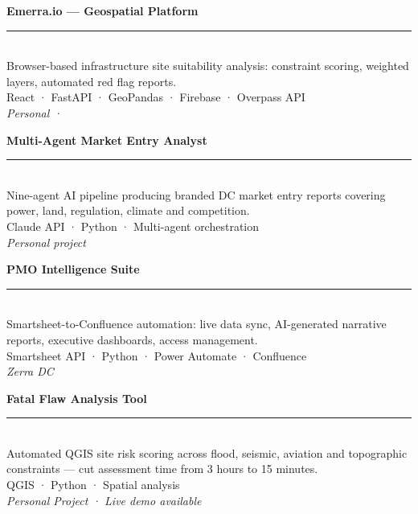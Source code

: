 \newcommand{\shortproject}[4]{%
  \begin{minipage}[t]{0.46\textwidth}
    \vspace{0pt}
    {\small\textcolor{Primary2}{\textbf{#1}}}\\
    {\color{Primary2}\rule{\linewidth}{0.4pt}}\\[1pt]
    {\small\textcolor{Dark}{#2}}\\[2pt]
    {\footnotesize\textcolor{Grey1}{#3}}\\[1pt]
    {\footnotesize\textit{#4}}
  \end{minipage}%
}

\vspace{2mm}
\noindent
\shortproject{Emerra.io — Geospatial Platform}%
  {Browser-based infrastructure site suitability analysis: constraint scoring, weighted layers, automated red flag reports.}%
  {React · FastAPI · GeoPandas · Firebase · Overpass API}%
  {Personal · \href{https://emerra.io}{\hyperText{emerra.io}}}%
\hfill
\shortproject{Multi-Agent Market Entry Analyst}%
  {Nine-agent AI pipeline producing branded DC market entry reports covering power, land, regulation, climate and competition.}%
  {Claude API · Python · Multi-agent orchestration}%
  {Personal project}%

\vspace{4mm}
\noindent
\shortproject{PMO Intelligence Suite}%
  {Smartsheet-to-Confluence automation: live data sync, AI-generated narrative reports, executive dashboards, access management.}%
  {Smartsheet API · Python · Power Automate · Confluence}%
  {Zerra DC}%
\hfill
\shortproject{Fatal Flaw Analysis Tool}%
  {Automated QGIS site risk scoring across flood, seismic, aviation and topographic constraints — cut assessment time from 3 hours to 15 minutes.}%
  {QGIS · Python · Spatial analysis}%
  {Personal Project · Live demo available}%
\vspace{2mm}
